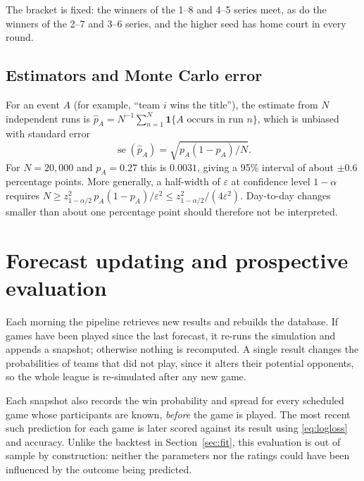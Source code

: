 \documentclass[11pt]{article}
\newcommand{\Nsims}{20{,}000}      %
\newcommand{\ind}{\mathbf{1}}
\theoremstyle{plain}
\theoremstyle{definition}
\theoremstyle{remark}
\begin{document}
The bracket is fixed: the winners of the 1--8 and 4--5 series meet, as do the winners of the 2--7 and 3--6 series, and the higher seed has home court in every round.

\subsection{Estimators and Monte Carlo error}

For an event $A$ (for example, ``team $i$ wins the title''), the estimate from $N$ independent runs is $\hat p_A = N^{-1}\sum_{n=1}^N \ind\{A \text{ occurs in run } n\}$, which is unbiased with standard error
\begin{equation}\label{eq:mcse}
  \operatorname{se}(\hat p_A) = \sqrt{p_A(1-p_A)/N}.
\end{equation}
For $N = \Nsims$ and $p_A = 0.27$ this is $0.0031$, giving a 95\% interval of about $\pm 0.6$ percentage points. More generally, a half-width of $\varepsilon$ at confidence level $1-\alpha$ requires $N \ge z_{1-\alpha/2}^2\,p_A(1-p_A)/\varepsilon^2 \le z_{1-\alpha/2}^2/(4\varepsilon^2)$. Day-to-day changes smaller than about one percentage point should therefore not be interpreted.

\section{Forecast updating and prospective evaluation}\label{sec:forecast}

Each morning the pipeline retrieves new results and rebuilds the database. If games have been played since the last forecast, it re-runs the simulation and appends a snapshot; otherwise nothing is recomputed. A single result changes the probabilities of teams that did not play, since it alters their potential opponents, so the whole league is re-simulated after any new game.

Each snapshot also records the win probability and spread for every scheduled game whose participants are known, \emph{before} the game is played. The most recent such prediction for each game is later scored against its result using \eqref{eq:logloss} and accuracy. Unlike the backtest in Section~\ref{sec:fit}, this evaluation is out of sample by construction: neither the parameters nor the ratings could have been influenced by the outcome being predicted.
\end{document}
